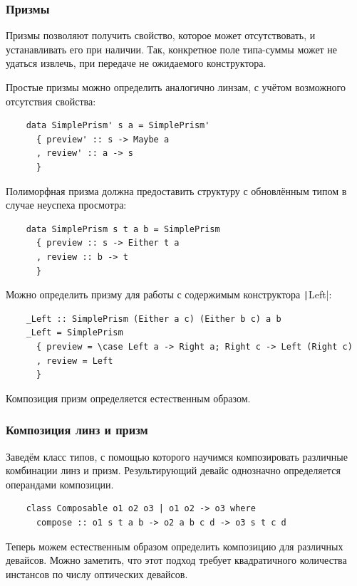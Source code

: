 \subsubsection{Призмы}

Призмы позволяют получить свойство, которое может отсутствовать, и устанавливать его при наличии.
Так, конкретное поле типа-суммы может не удаться извлечь, при передаче не ожидаемого конструктора.

Простые призмы можно определить аналогично линзам, с учётом возможного отсутствия свойства:

\begin{verbatim}
    data SimplePrism' s a = SimplePrism'
      { preview' :: s -> Maybe a
      , review' :: a -> s
      }
\end{verbatim}

Полиморфная призма должна предоставить структуру с обновлённым типом в случае неуспеха просмотра:
\begin{verbatim}
    data SimplePrism s t a b = SimplePrism
      { preview :: s -> Either t a
      , review :: b -> t
      }
\end{verbatim}

Можно определить призму для работы с содержимым конструктора \texttt|Left|:
\begin{verbatim}
    _Left :: SimplePrism (Either a c) (Either b c) a b
    _Left = SimplePrism
      { preview = \case Left a -> Right a; Right c -> Left (Right c)
      , review = Left
      }
\end{verbatim}

Композиция призм определяется естественным образом.


\subsubsection{Композиция линз и призм}

Заведём класс типов, с помощью которого научимся композировать различные комбинации линз и призм.
Результирующий девайс однозначно определяется операндами композиции.

\begin{verbatim}
    class Composable o1 o2 o3 | o1 o2 -> o3 where
      compose :: o1 s t a b -> o2 a b c d -> o3 s t c d
\end{verbatim}

Теперь можем естественным образом определить композицию для различных девайсов.
Можно заметить, что этот подход требует квадратичного количества инстансов по числу оптических девайсов.

